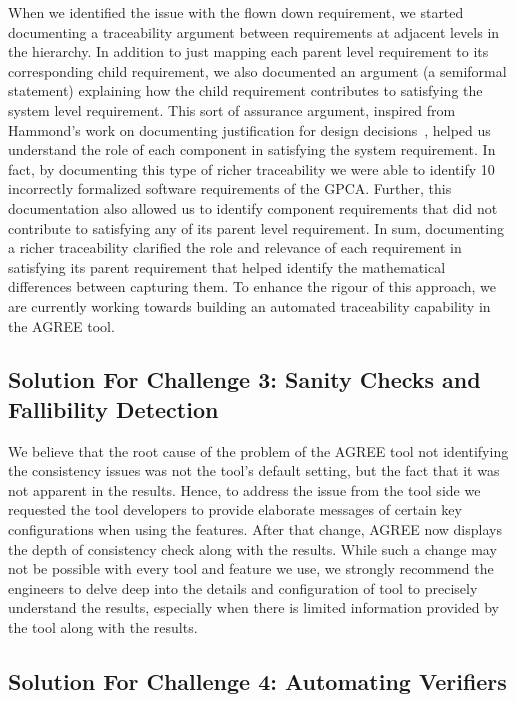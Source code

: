 When we identified the issue with the flown down requirement, we started documenting a traceability argument between requirements at adjacent levels in the hierarchy. In addition to just mapping each parent level requirement to its corresponding child requirement, we also documented an argument (a semiformal statement) explaining how the child requirement contributes to satisfying the system level requirement. This sort of assurance argument, inspired from Hammond's work on documenting justification for design decisions~\cite{Hammond01:WiW}, helped us understand the role of each component in satisfying the system requirement. In fact, by documenting this type of richer traceability we were able to identify 10 incorrectly formalized software requirements of the GPCA. Further, this documentation also allowed us to identify component requirements that did not contribute to satisfying any of its parent level requirement. In sum, documenting a richer traceability clarified the role and relevance of each requirement in satisfying its parent requirement that helped identify the mathematical differences between capturing them. To enhance the rigour of this approach, we are currently working towards building an automated traceability capability in the AGREE tool.
%
 

\subsection {Solution For Challenge 3: Sanity Checks and Fallibility Detection}

We believe that the root cause of the problem of the AGREE tool not identifying the consistency issues was not the tool's default setting, but the fact that it was not apparent in the results. Hence, to address the issue from the tool side we requested the tool developers to provide elaborate messages of certain key configurations when using the features. After that change, AGREE now displays the depth of consistency check along with the results. While such a change may not be possible with every tool and feature we use, we strongly recommend the engineers to delve deep into the details and configuration of tool to precisely understand the results, especially when there is limited information provided by the tool along with the results.

\subsection {Solution For Challenge 4: Automating Verifiers}

